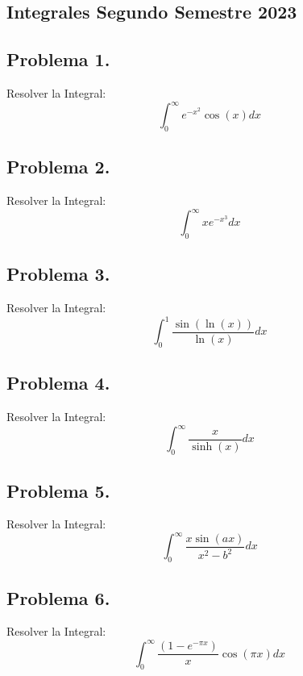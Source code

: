
\begin{center}
    \section{Integrales Segundo Semestre 2023}

    \begin{CajaTitulo}{\begin{center}\subsection*{Problema 1.}\end{center}}
        Resolver la Integral: \[\int_{0}^{\infty}e^{-x^2}\cos(x)      dx\]
    \end{CajaTitulo} 

    \begin{CajaTitulo}{\begin{center}\subsection*{Problema 2.}\end{center}}
        Resolver la Integral: \[\int_{0}^{\infty}xe^{-x^3}dx\]
    \end{CajaTitulo} 

    \begin{CajaTitulo}{\begin{center}\subsection*{Problema 3.}\end{center}}
        Resolver la Integral: \[\int_{0}^{1}\frac{\sin(\ln(x))}{\ln(x)}      dx\]
    \end{CajaTitulo} 
    
    \begin{CajaTitulo}{\begin{center}\subsection*{Problema 4.}\end{center}}
        Resolver la Integral: \[\int_{0}^{\infty}\frac{x}{\sinh(x)}dx\]
    \end{CajaTitulo} 
    
    \begin{CajaTitulo}{\begin{center}\subsection*{Problema 5.}\end{center}}
        Resolver la Integral: \[\int_{0}^{\infty}\frac{x\sin(ax)}{x^2 - b^2}  dx\]
    \end{CajaTitulo} 

    \begin{CajaTitulo}{\begin{center}\subsection*{Problema 6.}\end{center}}
        Resolver la Integral: \[\int_{0}^{\infty}\frac{(1-e^{-\pi x})}{x}\cos(\pi x ) dx\]
    \end{CajaTitulo} 

\end{center}
